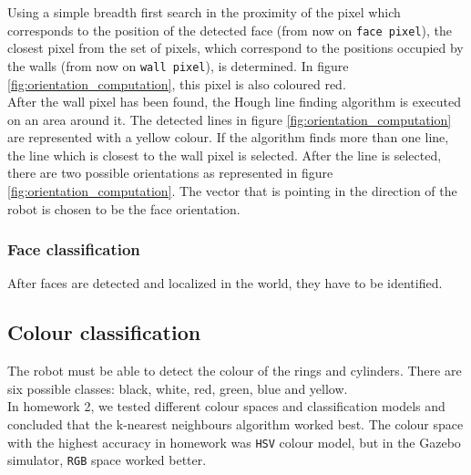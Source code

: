 \documentclass[12pt,a4paper]{article}
\begin{document}
	Using a simple breadth first search in the proximity of the pixel which corresponds to the position of the detected face (from now on \texttt{face pixel}), the closest pixel from the set of pixels, which correspond to the positions occupied by the walls (from now on \texttt{wall pixel}), is determined. In figure \ref{fig:orientation_computation}, this pixel is also coloured red. \\
	
	After the wall pixel has been found, the Hough line finding algorithm is executed on an area around it. The detected lines in figure \ref{fig:orientation_computation} are represented with a yellow colour. If the algorithm finds more than one line, the line which is closest to the wall pixel is selected. After the line is selected, there are two possible orientations as represented in figure \ref{fig:orientation_computation}. The vector that is pointing in the direction of the robot is chosen to be the face orientation. \\ 
	
	\subsubsection{Face classification}
	After faces are detected and localized in the world, they have to be identified.
	
	\subsection{Colour classification} \label{colour_classification}
	The robot must be able to detect the colour of the rings and cylinders. There are six possible classes: black, white, red, green, blue and yellow. \\
	
	In homework 2, we tested different colour spaces and classification models and concluded that the k-nearest neighbours algorithm worked best. The colour space with the highest accuracy in homework was \texttt{HSV} colour model, but in the Gazebo simulator, \texttt{RGB} space worked better. \\
	
\end{document}

